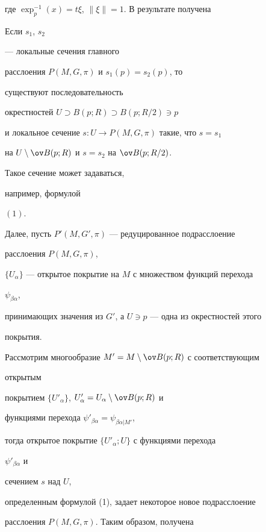 где $\exp^{-1}_p(x)=t\xi$, $\|\xi\|=1$. В результате получена


 


\begin{thm} Если $s_1$, $s_2$ 


--- локальные сечения главного 


расслоения $P(M,G,\pi)$ и $s_1(p)=s_2(p)$, то 


существуют последовательность 


окрестностей $U\supset B(p;R)\supset B(p;R/2)\ni p$ 


и локальное сечение $s:U\to P(M,G,\pi)$ такие, что $s=s_1$ 


на $U\setminus\ov B(p;R)$ и $s=s_2$ на $\ov B(p;R/2)$. 


Такое сечение может задаваться, 


например, формулой 


$(1)$. 


\end{thm} 


 


Далее, пусть $P'(M,G',\pi)$ --- редуцированное подрасслоение 


расслоения $P(M,G,\pi)$, 


$\{U_\alpha\}$ --- открытое покрытие на $M$ с множеством функций перехода 


$\psi_{\beta\alpha}$, 


принимающих значения из $G'$, а $U\ni p$ --- одна из окрестностей этого 


покрытия. 


 


Рассмотрим многообразие $M'=M\setminus\ov B(p;R)$ с соответствующим 


открытым 


покрытием $\{U'_\alpha\}$, $U'_\alpha=U_\alpha\setminus\ov B(p;R)$ и 


функциями перехода $\psi'_{\beta\alpha}=\psi_{\beta\alpha|M'}$, 


тогда открытое покрытие $\{U'_\alpha;U\}$ с функциями перехода 


$\psi'_{\beta\alpha}$ и 


сечением $s$ над $U$, 


определенным формулой (1), задает некоторое новое подрасслоение 


расслоения $P(M,G,\pi)$. Таким образом, получена


